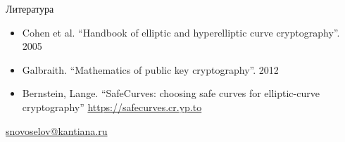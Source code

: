 \documentclass{beamer}
\begin{document}
\begin{frame}{Литература}

    
    \begin{itemize}
    	\item[\faBook] Cohen et al. ``Handbook of elliptic and hyperelliptic curve cryptography''. 2005
    	\vspace{0.5em}
    	\item[\faBook] Galbraith. ``Mathematics of public key cryptography''. 2012
    	\vspace{0.5em}
    	\item[\faBook] Bernstein, Lange. ``SafeCurves: choosing safe curves for elliptic-curve cryptography'' \href{https://safecurves.cr.yp.to}{https://safecurves.cr.yp.to}
    \end{itemize}
    
    \begin{center}
        \begin{tcolorbox}[enhanced,hbox,colback=block-green-color-bg,colframe=subsection-color!120,title=Контакты,center title]
            \begin{varwidth}{\textwidth}
                \begin{center}
                    \href{mailto:snovoselov@kantiana.ru}{snovoselov@kantiana.ru}
                \end{center}
            \end{varwidth}
        \end{tcolorbox}	
    \end{center}
\end{frame}
\end{document}
